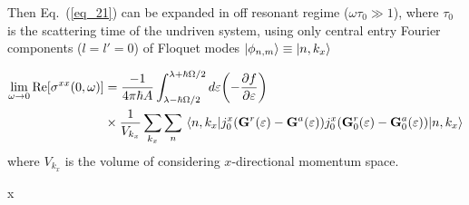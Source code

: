 Then Eq.~(\ref{eq_21}) can be expanded in off resonant regime ($\omega\tau_0 \gg 1$), where $\tau_0$ is the scattering time of the undriven system, using only central entry Fourier components ($l=l'=0$) of Floquet modes $\ket{\phi_{n,m}} \equiv \ket{n,k_x}$
\begin{widetext}
\begin{equation} \label{7.2}
  \begin{aligned}
    \lim_{\omega \to 0}
    \text{Re}[{\sigma}^{xx}(0,\omega)] & =
    \frac{-1}{4\pi\hbar A}
    \int_{\lambda-\hbar\Omega/2}^{\lambda+ \hbar\Omega/2} d\varepsilon
    \qty(
    -\frac{\partial f}{\partial \varepsilon})
    \\
    & \times
    \frac{1}{V_{k_x}} \sum_{k_x}
    \sum_{n}
    \mel{n,k_x}{
    {j}^x_0
    \qty(
    \vb{G}^{r} (\varepsilon) - \vb{G}^{a} (\varepsilon)
    )
    {j}^x_0
    \qty(
    \vb{G}^{r}_0 (\varepsilon) - \vb{G}^{a}_0 (\varepsilon)
    )
    }
    {n,k_x}
  \end{aligned}
\end{equation}
where $V_{k_x}$ is the volume of considering $x$-directional momentum space. 
\end{widetext}























 x

